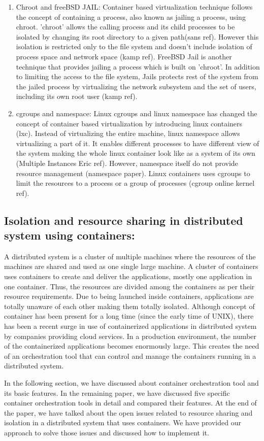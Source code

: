 \begin{enumerate}
\item Chroot and freeBSD JAIL: 
Container based virtualization technique follows the concept of containing a process, also known as jailing a process, using chroot. 'chroot' allows the calling process and its child processes to be isolated by changing its root directory to a given path(sans ref). However this isolation is restricted only to the file system and doesn't include isolation of process space and network space (kamp ref).
FreeBSD Jail is another technique that provides jailing a process which is built on 'chroot'. In addition to limiting the access to the file system, Jails protects rest of the system from the jailed process by virtualizing the network subsystem and the set of users, including its own root user (kamp ref).
\item cgroups and namespace:
Linux cgroups and linux namespace has changed the concept of container based virtualization by introducing linux containers (lxc). Instead of virtualizing the entire machine, linux namespace allows virtualizing a part of it. It enables different processes to have different view of the system making the whole linux container look like as a system of its own (Multiple Instances Eric ref). However, namespace itself do not provide resource management (namespace paper). Linux containers uses cgroups to limit the resources to a process or a group of processes (cgroup online kernel ref).
\end{enumerate}

\subsection{Isolation and resource sharing in distributed system using containers:}
\label{sec:IsRsDCcont}
A distributed system is a cluster of multiple machines where the resources of the machines are shared and used as one single large machine. A cluster of containers uses containers to create and deliver the applications, mostly one application in one container. Thus, the resources are divided among the containers as per their resource requirements. Due to being launched inside containers, applications are totally unaware of each other making them totally isolated. Although concept of container has been present for a long time (since the early time of UNIX), there has been a recent surge in use of containerized applications in distributed system by companies providing cloud services. In a production environment, the number of the containerized applications becomes enormously large. This creates the need of an orchestration tool that can control and manage the containers running in a distributed system.

In the following section, we have discussed about container orchestration tool and its basic features. In the remaining paper, we have discussed five specific container orchestration tools in detail and compared their features. At the end of the paper, we have talked about the open issues related to resource sharing and isolation in a distributed system that uses containers. We have provided our approach to solve those issues and discussed how to implement it.

